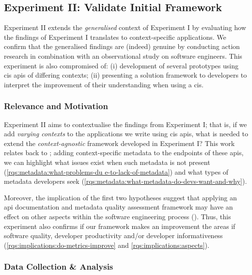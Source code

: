 \subsection{Experiment II: Validate Initial Framework}
\label{ssec:research-methodology:experiments:2}

Experiment II extends the \textit{generalised} context of Experiment I by evaluating how the findings of Experiment I translates to context-specific applications. We confirm that the generalised findings are (indeed) genuine by conducting action research in combination with an observational study on software engineers. This experiment is also compromised of: (i) development of several prototypes using \gls{cis} \glspl{api} of differing contexts; (ii) presenting a solution framework to developers to interpret the improvement of their understanding when using a \gls{cis}.

\subsubsection{Relevance and Motivation}

Experiment II aims to contextualise the findings from Experiment I; that is, if we add \textit{varying contexts} to the applications we write using \gls{cis} \glspl{api}, what is needed to extend the \textit{context-agnostic} framework developed in Experiment I? This work relates back to ; adding context-specific metadata to the endpoints of these \glspl{api}, we can highlight what issues exist when such metadata is not present (\ref{rqs:metadata:what-problems-du                                                                e-to-lack-of-metadata}) and what types of metadata developers seek (\ref{rqs:metadata:what-metadata-do-devs-want-and-why}).

Moreover, the implication of the first two hypotheses suggest that applying an \gls{api} documentation and metadata quality assessment framework may have an effect on other aspects within the software engineering process (). Thus, this experiment also confirms if our framework makes an improvement the areas if software quality, developer productivity and/or developer informativeness (\ref{rqs:implications:do-metrics-improve} and \ref{rqs:implications:aspects}).

\subsubsection{Data Collection \& Analysis}

